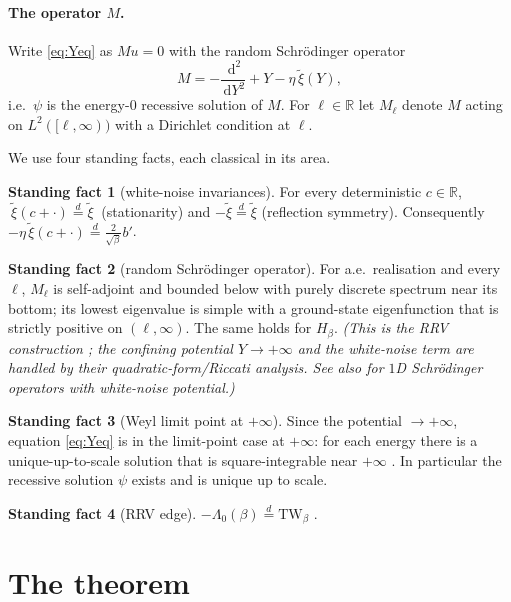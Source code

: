 \documentclass[11pt]{article}
\theoremstyle{definition}
\newtheorem{assumption}{Standing fact}
\theoremstyle{remark}
\newcommand{\dd}{\,\mathrm{d}}
\newcommand{\TW}{\mathrm{TW}}
\newcommand{\R}{\mathbb{R}}
\newcommand{\eqd}{\stackrel{d}{=}}
\newcommand{\xit}{\widetilde{\xi}}
\begin{document}
\paragraph{The operator $M$.} Write \eqref{eq:Yeq} as $Mu=0$ with the random
Schr\"odinger operator
\begin{equation}\label{eq:M}
  M=-\frac{\dd^2}{\dd Y^2}+Y-\eta\,\xit(Y),
\end{equation}
i.e.\ $\psi$ is the energy-$0$ recessive solution of $M$. For $\ell\in\R$ let
$M_\ell$ denote $M$ acting on $L^2([\ell,\infty))$ with a Dirichlet condition at $\ell$.

We use four standing facts, each classical in its area.

\begin{assumption}[white-noise invariances]\label{F1}
For every deterministic $c\in\R$, $\ \xit(c+\cdot)\eqd\xit\ $ (stationarity) and
$-\xit\eqd\xit$ (reflection symmetry). Consequently $-\eta\,\xit(c+\cdot)\eqd
\tfrac{2}{\sqrt\beta}b'$.
\end{assumption}

\begin{assumption}[random Schr\"odinger operator]\label{F2}
For a.e.\ realisation and every $\ell$, $M_\ell$ is self-adjoint and bounded below with
purely discrete spectrum near its bottom; its lowest eigenvalue is simple with a
ground-state eigenfunction that is strictly positive on $(\ell,\infty)$. The same holds
for $H_\beta$. \emph{(This is the RRV construction \cite{RRV}; the confining potential
$Y\to+\infty$ and the white-noise term are handled by their quadratic-form/Riccati
analysis. See also \cite{FN} for $1$D Schr\"odinger operators with white-noise potential.)}
\end{assumption}

\begin{assumption}[Weyl limit point at $+\infty$]\label{F3}
Since the potential $\to+\infty$, equation \eqref{eq:Yeq} is in the limit-point case at
$+\infty$: for each energy there is a unique-up-to-scale solution that is square-integrable
near $+\infty$ \cite{CL}. In particular the recessive solution $\psi$ exists and is
unique up to scale.
\end{assumption}

\begin{assumption}[RRV edge]\label{F4}
$-\Lambda_0(\beta)\eqd\TW_\beta$ \cite{RRV}.
\end{assumption}

\section{The theorem}
\end{document}
